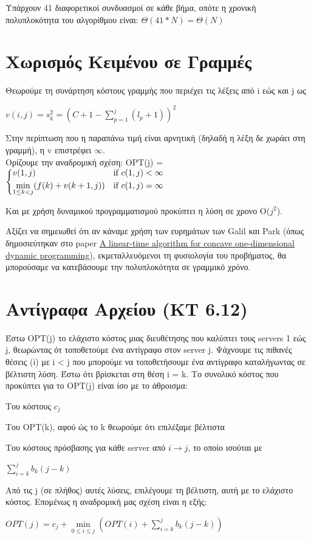 \documentclass[a4paper,11pt]{article}
\begin{document}
Υπάρχουν 41 διαφορετικοί συνδυασμοί σε κάθε βήμα, οπότε η χρονική
πολυπλοκότητα του αλγορίθμου είναι: $\Theta{(41*N)} = \Theta{(N)}$


\section{Χωρισμός Κειμένου σε Γραμμές}
Θεωρούμε τη συνάρτηση κόστους γραμμής που περιέχει τις λέξεις από i εώς και j
ως \begin{center}$v(i,j) = s_k^2 = (C + 1 - \sum\limits_{p = 1}^{j} (l_p
+1))^2$ \end{center}
Στην περίπτωση που η παραπάνω τιμή είναι αρνητική (δηλαδή η λέξη δε χωράει στη
γραμμή), η v επιστρέφει $\infty$.\\
Ορίζουμε την αναδρομική σχέση:
OPT(j) =$
\begin{dcases}
    v(1,j) & \text{if } c(1,j) < \infty\\
    \min\limits_{1 \leq k < j} (f(k) + v(k + 1, j)) & \text{if } c(1,j) =
    \infty
\end{dcases}$

Και με χρήση δυναμικού προγραμματισμού προκύπτει η λύση σε χρονο O($j^2$).

Αξίζει να σημειωθεί ότι αν κάναμε χρήση των ευρημάτων των Galil και Park
(όπως δημοσιεύτηκαν στο paper \href{http://www.cs.ust.hk/mjg_lib/bibs/DPSu/DPSu.Files/GaPa90.PDF}{A
linear-time algorithm for concave one-dimensional dynamic programming}),
εκμεταλλευόμενοι τη φυσιολογία του προβήματος, θα
μπορούσαμε να κατεβάσουμε την πολυπλοκότητα σε γραμμικό χρόνο.


\newpage
\section{Αντίγραφα Αρχείου (KT 6.12)}
Έστω OPT(j) το ελάχιστο κόστος μιας διευθέτησης που καλύπτει τους servers 1
εώς j, θεωρώντας ότ τοποθετούμε ένα αντίγραφο στον server j. Ψάχνουμε τις
πιθανές θέσεις (i) με i < j που μπορούμε να τοποθετήσουμε ένα αντίγραφο
καταλήγωντας σε βέλτιστη λύση. Έστω ότι βρίσκεται στη θέση i = k.
Το συνολικό κόστος που προκύπτει για το OPT(j) είναι ίσο με το άθροισμα:
\begin{list}{*}{}
\item Του κόστους $c_j$
\item Του OPT(k), αφού ώς το k θεωρούμε ότι επιλέξαμε βέλτιστα
\item Του κόστους πρόσβασης για κάθε server από $i \to j$, το οποίο ισούται με
\begin{center} $\sum\limits_{i = k}^{j} b_k (j-k)$ \end{center}
\end{list}
Από τις j (σε πλήθος) αυτές λύσεις, επιλέγουμε τη βέλτιστη, αυτή με το
ελάχιστο κόστος. Επομένως η αναδρομική μας σχέση είναι η εξής:
\begin{center}
$OPT(j) = c_j + \min\limits_{0 \leq i \leq j}(OPT(i)+\sum\limits_{i = k}^{j}
b_k (j-k))$
\end{center}
\end{document}
